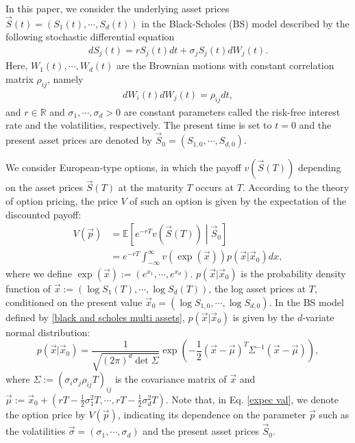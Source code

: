In this paper, we consider the underlying asset prices $\vec{S}(t)=(S_1(t),\cdots,S_d(t))$ in the Black-Scholes (BS) model described by the following stochastic differential equation
\begin{align}
    dS_{j}(t) = rS_{j}(t)dt + \sigma_j S_{j}(t) dW_{j}(t).
\label{black and scholes multi assets}
\end{align}
Here, $W_1(t),\cdots,W_d(t)$ are the Brownian motions with constant correlation matrix $\rho_{ij}$, namely
\begin{align}
    dW_{i}(t) dW_{j}(t) = \rho_{ij}dt, \tag{10}
\label{gauss correlation}
\end{align}
and $r\in\mathbb{R}$ and $\sigma_1,\cdots,\sigma_d>0$ are constant parameters called the risk-free interest rate and the volatilities, respectively.
The present time is set to $t=0$ and the present asset prices are denoted by $\vec{S}_0=(S_{1,0},\cdots,S_{d,0})$.

We consider European-type options, in which the payoff $v(\vec{S}(T))$ depending on the asset prices $\vec{S}(T)$ at the maturity $T$ occurs at $T$.
According to the theory of option pricing, the price $V$ of such an option is given by the expectation of the discounted payoff:
\begin{align}
    V(\vec{p})&=\mathbb{E}\left[e^{-rT}v(\vec{S}(T))\middle|\vec{S}_0\right] \nonumber \\
    &=e^{-rT} \int_{-\infty}^{\infty} v(\exp(\vec{x}))p(\vec{x}|\vec{x}_0)dx,
    \label{expec val}
\end{align}
where we define $\exp(\vec{x}):=(e^{x_1},\cdots,e^{x_d})$.
$p(\vec{x}|\vec{x}_0)$ is the probability density function of $\vec{x}:=(\log S_1(T),\cdots,\log S_d(T))$, the log asset prices at $T$, conditioned on the present value $\vec{x}_0=(\log S_{1,0},\cdots,\log S_{d,0})$.
In the BS model defined by \eqref{black and scholes multi assets}, $p(\vec{x}|\vec{x}_0)$ is given by the $d$-variate normal distribution:
\begin{equation}
    p(\vec{x}|\vec{x}_0) = \frac{1}{\sqrt{(2 \pi)^d \det \Sigma}} \exp\left(-\frac{1}{2}\left(\vec{x}-\vec{\mu}\right)^T \Sigma^{-1} \left(\vec{x}-\vec{\mu}\right)\right),
\end{equation}
where $\Sigma:=(\sigma_i\sigma_j \rho_{ij}T)_{ij}$ is the covariance matrix of $\vec{x}$ and $\vec{\mu}:=\vec{x}_0+\left(rT-\frac{1}{2}\sigma_1^2T,\cdots,rT-\frac{1}{2}\sigma_d^2T\right)$.
Note that, in Eq. \eqref{expec val}, we denote the option price by $V(\vec{p})$, indicating its dependence on the parameter $\vec{p}$ such as the volatilities $\vec{\sigma}=(\sigma_1,\cdots,\sigma_d)$ and the present asset prices $\vec{S}_0$.


